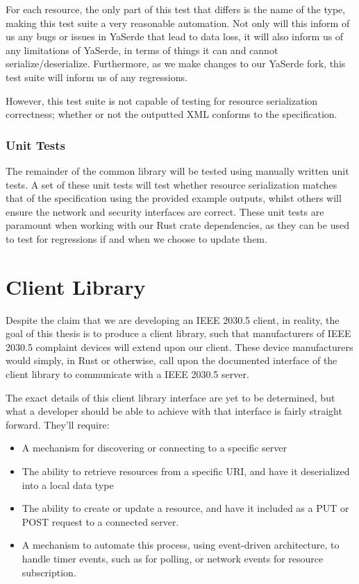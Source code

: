 For each resource, the only part of this test that differs is the name of the type, making this test suite a very reasonable automation.
Not only will this inform of us any bugs or issues in YaSerde that lead to data loss, it will also inform us of any limitations of YaSerde, in terms of things it can and cannot serialize/deserialize.
Furthermore, as we make changes to our YaSerde fork, this test suite will inform us of any regressions.

However, this test suite is not capable of testing for resource serialization correctness; whether or not the outputted XML conforms to the specification. 

\subsubsection{Unit Tests}
The remainder of the common library will be tested using manually written unit tests.
A set of these unit tests will test whether resource serialization matches that of the specification using the provided example outputs, whilst others will ensure the network and security interfaces are correct.
These unit tests are paramount when working with our Rust crate dependencies, as they can be used to test for regressions if and when we choose to update them.

\section{Client Library}
Despite the claim that we are developing an IEEE 2030.5 client, in reality, the goal of this thesis is to produce a client library, such that manufacturers of IEEE 2030.5 complaint devices will extend upon our client.
These device manufacturers would simply, in Rust or otherwise, call upon the documented interface of the client library to communicate with a IEEE 2030.5 server.

The exact details of this client library interface are yet to be determined, but what a developer should be able to achieve with that interface is fairly straight forward. They'll require:

\begin{itemize}
    \item A mechanism for discovering or connecting to a specific server
    \item The ability to retrieve resources from a specific URI, and have it deserialized into a local data type
    \item The ability to create or update a resource, and have it included as a PUT or POST request to a connected server.
    \item A mechanism to automate this process, using event-driven architecture, to handle timer events, such as for polling, or network events for resource subscription.
\end{itemize}


